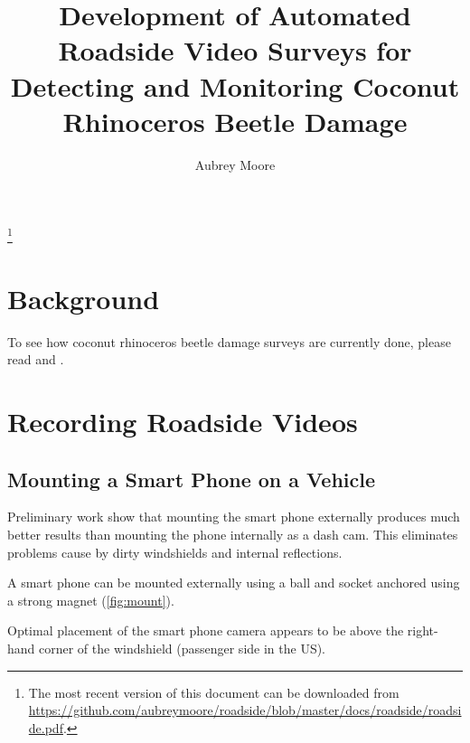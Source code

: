 \documentclass[12pt,letterpaper,english,bibliography=totocnumbered, abstract=on]{scrartcl}
\begin{document}
\titlehead{TECHNICAL REPORT}

\title{Development of Automated Roadside Video Surveys for Detecting and Monitoring Coconut Rhinoceros Beetle Damage}


\author{Aubrey Moore}

\maketitle

\footnote{The most recent version of this document can be downloaded from\\
	\url{https://github.com/aubreymoore/roadside/blob/master/docs/roadside/roadside.pdf}.}

\newpage
\tableofcontents
\newpage
\lstlistoflistings
\newpage
\listoffigures
\newpage

\section{Background}

To see how coconut rhinoceros beetle damage surveys are currently done, please read \cite{jackson_rhinoceros_2019-1} and \cite{vaqalo_coconut_2017}.

\section{Recording Roadside Videos}

\subsection{Mounting a Smart Phone on a Vehicle}

Preliminary work show that mounting the smart phone externally produces much better results than mounting the phone internally as a dash cam. This eliminates problems cause by dirty windshields and internal reflections.  

A smart phone can be mounted externally using a ball and socket anchored using a strong magnet (\ref{fig:mount}).

Optimal placement of the smart phone camera appears to be above the right-hand corner of the windshield (passenger side in the US). 
\end{document}
